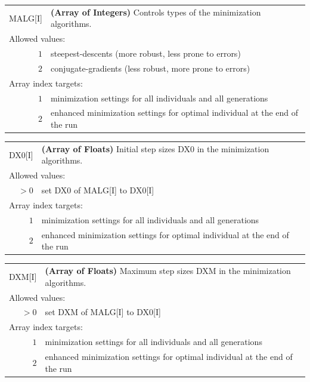 \documentclass[10pt,a4paper,openany]{memoir}
\numberwithin{equation}{section}
\begin{document}
{
\begin{tabular}{r@{ : }l}
\label{descr:malg}
      MALG[I]&\textbf{(Array of Integers)} Controls types of the minimization algorithms.                                                                             \\ 
\multicolumn{2}{l}{Allowed values:} \\ 
     \(1\)&steepest-descents (more robust, less prone to errors)                                                                                    \\ 
     \(2\)&conjugate-gradients (less robust, more prone to errors)                                                                                  \\ 
\multicolumn{2}{l}{Array index targets:} \\ 
     \(1\)&minimization settings for all individuals and all generations \\
     \(2\)&enhanced minimization settings for optimal individual at the end of the run \\
\end{tabular}
\vspace{1ex}
}

{
\begin{tabular}{r@{ : }l}
\label{descr:dx0}
       DX0[I]&\textbf{(Array of Floats)} Initial step sizes DX0 in the minimization algorithms.                                               \\ 
\multicolumn{2}{l}{Allowed values:} \\ 
    \(>0\)&set DX0 of MALG[I] to DX0[I]                                                                         \\ 
\multicolumn{2}{l}{Array index targets:} \\ 
     \(1\)&minimization settings for all individuals and all generations \\
     \(2\)&enhanced minimization settings for optimal individual at the end of the run \\
\end{tabular}
\vspace{1ex}
}

{
\begin{tabular}{r@{ : }l}
\label{descr:dxm}
  DXM[I]&\textbf{(Array of Floats)} Maximum step sizes DXM in the minimization algorithms.                                               \\ 
\multicolumn{2}{l}{Allowed values:} \\ 
  \(>0\)&set DXM of MALG[I] to DX0[I]                                                                         \\ 
\multicolumn{2}{l}{Array index targets:} \\ 
  \(1\)&minimization settings for all individuals and all generations \\
  \(2\)&enhanced minimization settings for optimal individual at the end of the run \\
\end{tabular}
\vspace{1ex}
}
\end{document}

